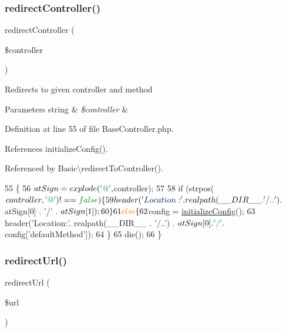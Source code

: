\subsubsection{\texorpdfstring{redirect\+Controller()}{redirectController()}}
{\footnotesize\ttfamily redirect\+Controller (\begin{DoxyParamCaption}\item[{}]{\$controller }\end{DoxyParamCaption})\hspace{0.3cm}{\ttfamily [protected]}}

Redirects to given controller and method


\begin{DoxyParams}[1]{Parameters}
string & {\em \$controller} & \\
\hline
\end{DoxyParams}


Definition at line 55 of file Base\+Controller.\+php.



References initialize\+Config().



Referenced by Basic\textbackslash{}redirect\+To\+Controller().


\begin{DoxyCode}
55                                                        \{
56         $atSign = explode(\textcolor{charliteral}{'@'}, $controller);
57 
58         \textcolor{keywordflow}{if} (strpos($controller, \textcolor{charliteral}{'@'}) !== \textcolor{keyword}{false}) \{
59             header(\textcolor{stringliteral}{'Location:'} . realpath(\_\_DIR\_\_ . \textcolor{stringliteral}{'/..'}) . $atSign[0] . \textcolor{charliteral}{'/'} . $atSign[1]);
60         \}
61         \textcolor{keywordflow}{else} \{
62             $config = \hyperlink{config_8php_afeb1d281d402615776fdb0320a5b8d05}{initializeConfig}();
63             header(\textcolor{stringliteral}{'Location:'}. realpath(\_\_DIR\_\_ . \textcolor{stringliteral}{'/..'}) . $atSign[0] . \textcolor{charliteral}{'/'} . $config[\textcolor{stringliteral}{'defaultMethod'}]);
64         \}
65         die();
66     \}
\end{DoxyCode}
\hypertarget{class_base_controller_a9f95c7503770ed9c974005b363ec3d00}{}\label{class_base_controller_a9f95c7503770ed9c974005b363ec3d00} 
\subsubsection{\texorpdfstring{redirect\+Url()}{redirectUrl()}}
{\footnotesize\ttfamily redirect\+Url (\begin{DoxyParamCaption}\item[{}]{\$url }\end{DoxyParamCaption})\hspace{0.3cm}{\ttfamily [protected]}}

